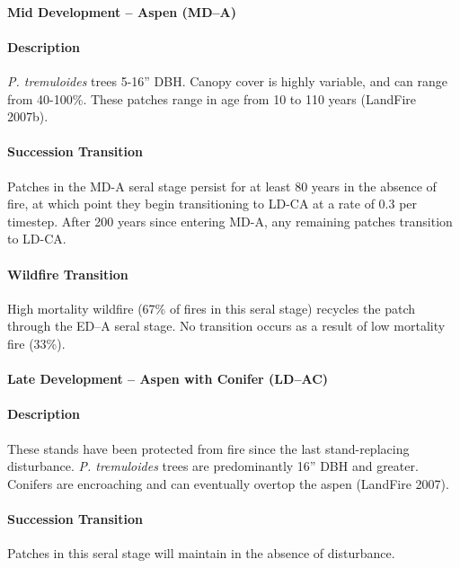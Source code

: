 \noindent\hrulefill


\paragraph{Mid Development – Aspen (MD–A)}

\paragraph{Description} \emph{P. tremuloides} trees 5-16'' DBH. Canopy cover is highly variable, and can range from 40-100\%. These patches range in age from 10 to 110 years (LandFire 2007b).

\paragraph{Succession Transition} Patches in the MD-A seral stage persist for at least 80 years in the absence of fire, at which point they begin transitioning to LD-CA at a rate of 0.3 per timestep. After 200 years since entering MD-A, any remaining patches transition to LD-CA. 

\paragraph{Wildfire Transition} High mortality wildfire (67\% of fires in this seral stage) recycles the patch through the ED–A seral stage. No transition occurs as a result of low mortality fire (33\%).

\noindent\hrulefill



\paragraph{Late Development – Aspen with Conifer (LD–AC)}

\paragraph{Description} These stands have been protected from fire since the last stand-replacing disturbance. \emph{P. tremuloides} trees are predominantly 16'' DBH and greater. Conifers are encroaching and can eventually overtop the aspen (LandFire 2007).

\paragraph{Succession Transition} Patches in this seral stage will maintain in the absence of disturbance.

